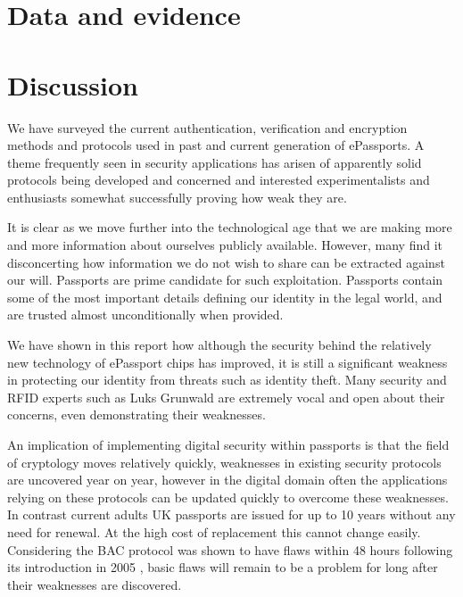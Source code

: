 \documentclass[12pt]{article}
\begin{document}
\section{Data and evidence}
{\color{red}{A strong report will make good use of data that are either collected as part of the project (please stay within the legal framework - so don't collect  data  on  system  vulnerabilities!),  or  publicly  available,  as  well  as  other published material.
Blah}}

\section{Discussion}
{\color{red}{This section will set the findings of the report within a wider context, and may for example make a case for including this material as part of the lectures in the module next year.}}

We have surveyed the current authentication, verification and encryption methods and protocols used in past and current generation of ePassports. 
A theme frequently seen in security applications has arisen of apparently solid protocols being developed and concerned and interested experimentalists and enthusiasts somewhat successfully proving how weak they are.

It is clear as we move further into the technological age that we are making more and more information about ourselves publicly available. However, many find it disconcerting how information we do not wish to share can be extracted against our will. Passports are prime candidate for such exploitation. Passports contain some of the most important details defining our identity in the legal world, and are trusted almost unconditionally when provided. 

We have shown in this report how although the security behind the relatively new technology of ePassport chips has improved, it is still a significant weakness in protecting our identity from threats such as identity theft. Many security and RFID experts such as Luks Grunwald are extremely vocal and open about their concerns, even demonstrating their weaknesses. 

An implication of implementing digital security within passports is that the field of cryptology moves relatively quickly, weaknesses in existing security protocols are uncovered year on year, however in the digital domain often the applications relying on these protocols can be updated quickly to overcome these weaknesses. In contrast current adults UK passports are issued for up to 10 years without any need for renewal. At the high cost of replacement this cannot change easily. Considering the BAC protocol was shown to have flaws within 48 hours following its introduction in 2005 \cite{Crackedit:wc}, basic flaws will remain to be a problem for long after their weaknesses are discovered. 
\end{document}
